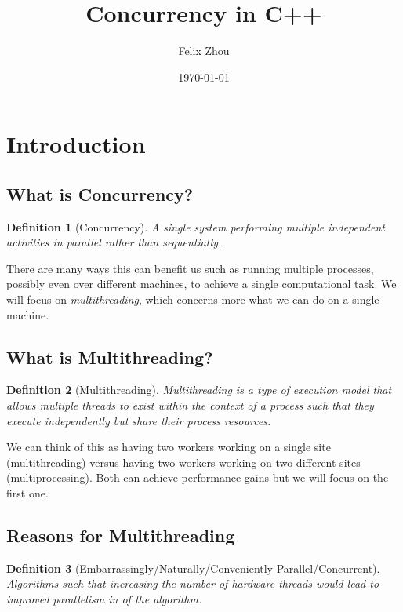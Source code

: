 \documentclass[10pt]{article}
\theoremstyle{break}
\newtheorem{defn}{Definition}[subsection]
\begin{document}
\let\ref\Cref

\title{\bf{Concurrency in C++}}
\date{\today}
\author{Felix Zhou}

\maketitle
\newpage
\tableofcontents
\listoffigures
\listoftables
\newpage

\section{Introduction}
\subsection{What is Concurrency?}
\begin{defn}[Concurrency]
    A single system performing multiple independent activities in parallel rather than sequentially.
\end{defn}

There are many ways this can benefit us such as running multiple processes, possibly even over different machines, to achieve a single computational task.
We will focus on \textit{multithreading}, which concerns more what we can do on a single machine.

\subsection{What is Multithreading?}
\begin{defn}[Multithreading]
    Multithreading is a type of execution model that allows multiple threads to exist within the context of a process such that they execute independently but share their process resources.
\end{defn}

We can think of this as having two workers working on a single site (multithreading) versus having two workers working on two different sites (multiprocessing).
Both can achieve performance gains but we will focus on the first one.

\subsection{Reasons for Multithreading}
\begin{defn}[Embarrassingly/Naturally/Conveniently Parallel/Concurrent]
    Algorithms such that increasing the number of hardware threads would lead to improved parallelism in of the algorithm.
\end{defn}
\end{document}
